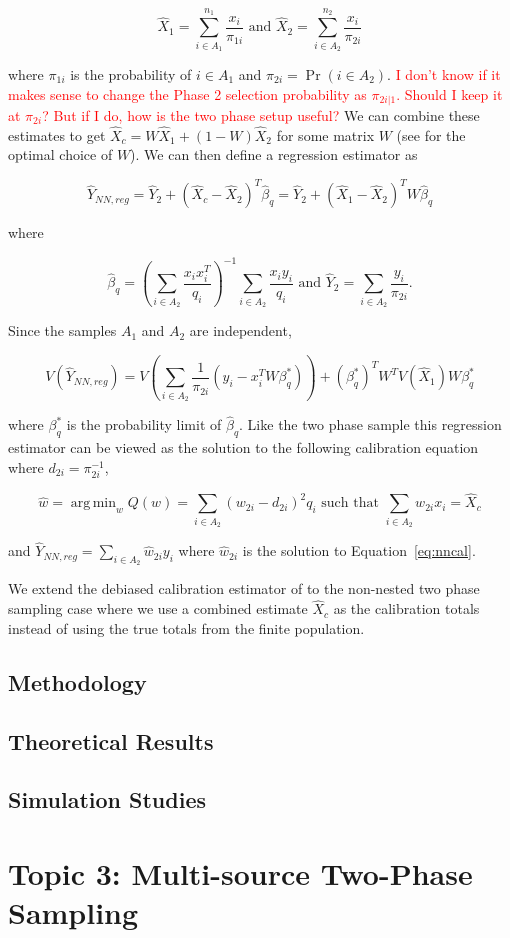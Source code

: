 \documentclass[12pt]{article}
\DeclareMathOperator*{\argmin}{arg\,min}
\begin{document}
$$\hat X_1 = \sum_{i \in A_1}^{n_1} \frac{x_i}{\pi_{1i}} \text{ and } 
\hat X_2 = \sum_{i \in A_2}^{n_2} \frac{x_i}{\pi_{2i}}$$

where $\pi_{1i}$ is the probability of $i \in A_1$ and $\pi_{2i} = \Pr(i \in
A_2)$. \textcolor{red}{I don't know if it makes sense to change the Phase 2
selection probability as $\pi_{2i|1}$. Should I keep it at $\pi_{2i}$? But if
I do, how is the two phase setup useful?} We can combine these estimates to get
$\hat X_c = W \hat X_1 + (1 - W)\hat X_2$ for some matrix $W$ (see
\cite{merkouris2004combining} for the optimal choice of $W$). We can then define
a regression estimator as

$$
\hat Y_{NN, reg} = \hat Y_2 + (\hat X_c - \hat X_2)^T \hat \beta_q = 
\hat Y_2 + (\hat X_1 - \hat X_2)^T W\hat \beta_q 
$$

where 

$$\hat \beta_q = \left(\sum_{i \in A_2} \frac{x_i x_i^T}{q_i}\right)^{-1}
\sum_{i \in A_2} \frac{x_i y_i}{q_i} \text{ and }\hat Y_2 = \sum_{i \in A_2}
\frac{y_i}{\pi_{2i}}.$$

Since the samples $A_1$ and $A_2$ are independent, 

$$V(\hat Y_{NN, reg}) = V\left(\sum_{i \in A_2} \frac{1}{\pi_{2i}}(y_i -
x_i^TW\beta^*_q)\right) + (\beta^*_q)^T W^T V(\hat X_1) W \beta_q^*$$

where $\beta_q^*$ is the probability limit of $\hat \beta_q$. Like the two phase
sample this regression estimator can be viewed as the solution to the following
calibration equation where $d_{2i} = \pi_{2i}^{-1}$,

\begin{equation}\label{eq:nncal}
\hat w = \argmin_w Q(w) = \sum_{i \in A_2} (w_{2i} - d_{2i})^2 q_i \text{ such
that } \sum_{i \in A_2} w_{2i} x_i = \hat X_c
\end{equation}

and $\hat Y_{NN, reg} = \sum_{i \in A_2} \hat w_{2i} y_i$ where $\hat
w_{2i}$ is the solution to Equation~\ref{eq:nncal}.

We extend the debiased calibration estimator of \cite{kwon2024debiased} to the
non-nested two phase sampling case where we use a combined estimate $\hat X_c$
as the calibration totals instead of using the true totals from the finite
population.

\subsection{Methodology}

\subsection{Theoretical Results}

\subsection{Simulation Studies}

\section{Topic 3: Multi-source Two-Phase Sampling}




\end{document}
